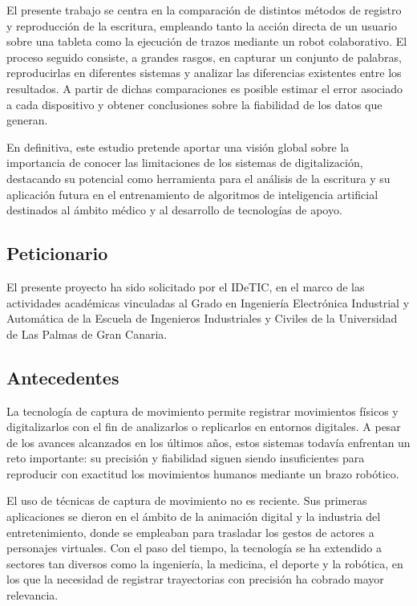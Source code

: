 \documentclass[12pt,a4paper,oneside]{report}
\begin{document}
El presente trabajo se centra en la comparación de distintos métodos de registro y reproducción de la escritura, empleando tanto la 
acción directa de un usuario sobre una tableta como la ejecución de trazos mediante un robot colaborativo. El proceso seguido consiste, 
a grandes rasgos, en capturar un conjunto de palabras, reproducirlas en diferentes sistemas y analizar las diferencias existentes 
entre los resultados. A partir de dichas comparaciones es posible estimar el error asociado a cada dispositivo y obtener conclusiones 
sobre la fiabilidad de los datos que generan.  

En definitiva, este estudio pretende aportar una visión global sobre la importancia de conocer las limitaciones de los sistemas de 
digitalización, destacando su potencial como herramienta para el análisis de la escritura y su aplicación futura en el entrenamiento 
de algoritmos de inteligencia artificial destinados al ámbito médico y al desarrollo de tecnologías de apoyo.  

\subsection{Peticionario}

El presente proyecto ha sido solicitado por el \acrfull{IDeTIC}, en el marco de las actividades académicas
vinculadas al Grado en Ingeniería Electrónica Industrial y Automática de la Escuela de
Ingenieros Industriales y Civiles de la Universidad de Las Palmas de Gran Canaria.

\subsection{Antecedentes}

La tecnología de captura de movimiento permite registrar movimientos físicos
y digitalizarlos con el fin de analizarlos o replicarlos en entornos digitales.
A pesar de los avances alcanzados en los últimos años, estos sistemas todavía
enfrentan un reto importante: su precisión y fiabilidad siguen siendo
insuficientes para reproducir con exactitud los movimientos humanos mediante
un brazo robótico.  

El uso de técnicas de captura de movimiento no es reciente. Sus primeras
aplicaciones se dieron en el ámbito de la animación digital y la industria del
entretenimiento, donde se empleaban para trasladar los gestos de actores a
personajes virtuales. Con el paso del tiempo, la tecnología se ha extendido a
sectores tan diversos como la ingeniería, la medicina, el deporte y la robótica,
en los que la necesidad de registrar trayectorias con precisión ha cobrado
mayor relevancia.  
\end{document}
